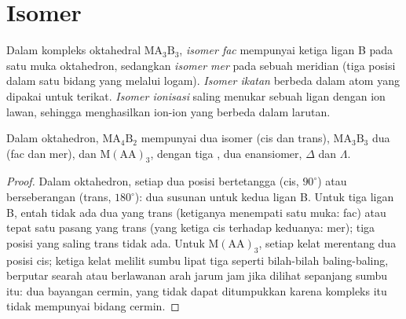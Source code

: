 \section{Isomer}

\begin{definition}\label{def:b2:coordination-complexes:isomers}
Dalam kompleks oktahedral $\mathrm{MA_3B_3}$, \emph{isomer fac}
mempunyai ketiga ligan B pada satu muka oktahedron, sedangkan \emph{isomer
mer} pada sebuah meridian (tiga posisi dalam satu bidang
yang melalui logam). \emph{Isomer ikatan} berbeda dalam
atom yang dipakai  untuk terikat. \emph{Isomer
ionisasi} saling menukar sebuah ligan dengan ion
lawan, sehingga menghasilkan ion-ion yang berbeda dalam larutan.
\end{definition}

\begin{proposition}\label{prop:b2:coordination-complexes:isomer-count}
Dalam oktahedron, $\mathrm{MA_4B_2}$ mempunyai dua isomer (cis dan trans), $\mathrm{MA_3B_3}$ dua
(fac dan mer), dan $\mathrm M(\mathrm{AA})_3$, dengan tiga ,
dua enansiomer, $\Delta$ dan $\Lambda$.
\end{proposition}

\begin{proof}
Dalam oktahedron, setiap dua posisi bertetangga (cis, $90^\circ$) atau
berseberangan (trans, $180^\circ$): dua susunan untuk kedua ligan B. Untuk
tiga ligan B, entah tidak ada dua yang trans (ketiganya menempati satu muka:
fac) atau tepat satu pasang yang trans (yang ketiga cis terhadap keduanya:
mer); tiga posisi yang saling trans tidak ada. Untuk
$\mathrm M(\mathrm{AA})_3$, setiap kelat merentang dua posisi cis; ketiga
kelat melilit sumbu lipat tiga seperti bilah-bilah baling-baling, berputar
searah atau berlawanan arah jarum jam jika dilihat sepanjang sumbu itu: dua
bayangan cermin, yang tidak dapat ditumpukkan karena kompleks itu tidak
mempunyai bidang cermin.
\end{proof}

